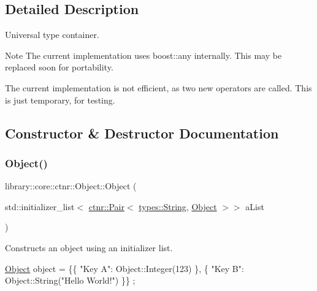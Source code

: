 \subsection{Detailed Description}
Universal type container. 

\begin{DoxyNote}{Note}
The current implementation uses boost\+::any internally. This may be replaced soon for portability. 

The current implementation is not efficient, as two new operators are called. This is just temporary, for testing. 
\end{DoxyNote}


\subsection{Constructor \& Destructor Documentation}
\mbox{\label{classlibrary_1_1core_1_1ctnr_1_1_object_a351131c4c1d6d7bd4f488ba99d7bf2d5}} 
\subsubsection{\texorpdfstring{Object()}{Object()}\hspace{0.1cm}{\footnotesize\ttfamily [1/2]}}
{\footnotesize\ttfamily library\+::core\+::ctnr\+::\+Object\+::\+Object (\begin{DoxyParamCaption}\item[{std\+::initializer\+\_\+list$<$ \hyperlink{_pair_8hpp_aad6f8de4c0f279c10436d59d4ace74bd}{ctnr\+::\+Pair}$<$ \hyperlink{classlibrary_1_1core_1_1types_1_1_string}{types\+::\+String}, \hyperlink{classlibrary_1_1core_1_1ctnr_1_1_object}{Object} $>$$>$}]{a\+List }\end{DoxyParamCaption})}



Constructs an object using an initializer list. 


\begin{DoxyCode}
\hyperlink{classlibrary_1_1core_1_1ctnr_1_1_object_a51bb72dec3a1b2738e0ad92b977b8d8d}{Object} \textcolor{keywordtype}{object} = \{\{ \textcolor{stringliteral}{"Key A"}: Object::Integer(123) \}, \{ \textcolor{stringliteral}{"Key B"}: Object::String(\textcolor{stringliteral}{"Hello World!"}) \}\} ;
\end{DoxyCode}



